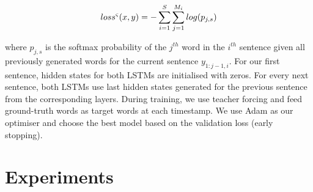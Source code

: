 \documentclass[11pt,a4paper]{article}
\begin{document}
\begin{equation}
    loss\sp{\varsigma}(x, y) = - \sum_{i=1}^{S}\sum_{j=1}^{M_i} log(p_{j,s})
\end{equation}

where $p_{j,s}$ is the softmax probability of the $j^{th}$ word in the $i^{th}$ sentence given all previously generated words for the current sentence $y_{1:j-1,i}$.
For our first sentence, hidden states for both LSTMs are initialised with zeros.
For every next sentence, both LSTMs use last hidden states generated for the previous sentence from the corresponding layers.
During training, we use teacher forcing and feed ground-truth words as target words at each timestamp.
We use Adam \cite{adam14} as our optimiser and choose the best model based on the validation loss (early stopping).


\section{Experiments}


\end{document}
